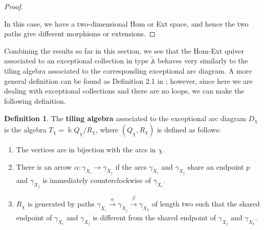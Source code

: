 \documentclass[12pt]{amsart}
\theoremstyle{plain}
\theoremstyle{definition}
\newtheorem{defn}{Definition}[section]
\theoremstyle{remark}
\begin{document}
\begin{proof}
\begin{center}

\end{center}

In this case, we have a two-dimensional Hom or Ext space, and hence the two paths give different morphisms or extensions.
\end{proof}
{\color{black} 
Combining the results so far in this section, we see that the Hom-Ext quiver associated to an exceptional collection in type $\tilde{\mathbb{A}}$ behaves very similarly to the tiling algebra associated to the corresponding exceptional arc diagram. A more general definition can be found as Definition 2.1 in \cite{baur2021geometric}; however, since here we are dealing with exceptional collections and there are no loops, we can make the following definition.

\begin{defn}
    The \textbf{tiling algebra} associated to the exceptional arc diagram $D_{\chi}$ is the algebra $T_{\chi} = \Bbbk Q_{\chi}/R_{\chi}$, where $(Q_{\chi},R_{\chi})$ is defined as follows:
    \begin{enumerate}
        \item The vertices are in bijection with the arcs in $\chi$.
        \item There is an arrow $\alpha:\gamma_{X_i} \rightarrow \gamma_{X_j}$ if the arcs $\gamma_{X_i}$ and $\gamma_{X_j}$ share an endpoint $p$ and $\gamma_{X_j}$ is immediately counterclockwise of $\gamma_{X_i}$.
        \item $R_{\chi}$ is generated by paths $\gamma_{X_i} \overset{\alpha}{\rightarrow} \gamma_{X_j} \overset{\beta}{\rightarrow} \gamma_{X_k}$ of length two such that the shared endpoint of $\gamma_{X_i}$ and $\gamma_{X_j}$ is different from the shared endpoint of $\gamma_{X_j}$ and $\gamma_{X_k}$. %
    \end{enumerate}
\end{defn}
} 
\end{document}
